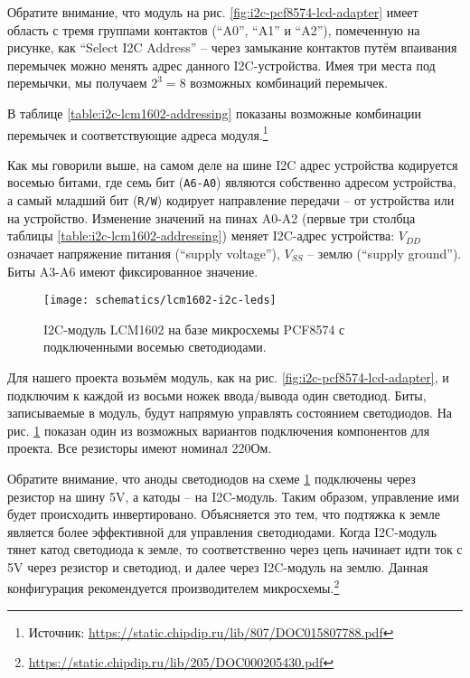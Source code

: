 \documentclass[../sparc.tex]{subfiles}
\begin{document}
Обратите внимание, что модуль на рис. \ref{fig:i2c-pcf8574-lcd-adapter} имеет
область с тремя группами контактов (``A0'', ``A1'' и ``A2''), помеченную на
рисунке, как ``Select I2C Address'' -- через замыкание контактов путём впаивания
перемычек можно менять адрес данного I2C-устройства.  Имея три места под
перемычки, мы получаем $2^3 = 8$ возможных комбинаций перемычек.


В таблице \ref{table:i2c-lcm1602-addressing} показаны возможные комбинации
перемычек и соответствующие адреса модуля.\footnote{Источник:
\url{https://static.chipdip.ru/lib/807/DOC015807788.pdf}}

Как мы говорили выше, на самом деле на шине I2C адрес устройства кодируется
восемью битами, где семь бит (\texttt{A6-A0}) являются собственно адресом
устройства, а самый младший бит (\texttt{R/W}) кодирует направление передачи --
от устройства или на устройство.  Изменение значений на пинах A0-A2 (первые три
столбца таблицы \ref{table:i2c-lcm1602-addressing}) меняет I2C-адрес устройства:
$V_{DD}$ означает напряжение питания (``supply voltage''), $V_{SS}$ -- землю
(``supply ground'').  Биты A3-A6 имеют фиксированное значение.

\begin{figure}[H]
  \centering
  \texttt{[image: schematics/lcm1602-i2c-leds]}
  \caption{I2C-модуль LCM1602 на базе микросхемы PCF8574 с подключенными восемью
    светодиодами.}
  \label{fig:lcm1602-i2c-leds}
\end{figure}

Для нашего проекта возьмём модуль, как на рис.
\ref{fig:i2c-pcf8574-lcd-adapter}, и подключим к каждой из восьми ножек
ввода/вывода один светодиод.  Биты, записываемые в модуль, будут напрямую
управлять состоянием светодиодов.  На рис. \ref{fig:lcm1602-i2c-leds} показан
один из возможных вариантов подключения компонентов для проекта.  Все резисторы
имеют номинал 220Ом.

Обратите внимание, что аноды светодиодов на схеме \ref{fig:lcm1602-i2c-leds}
подключены через резистор на шину 5V, а катоды -- на I2C-модуль.  Таким образом,
управление ими будет происходить инвертировано.  Объясняется это тем, что
подтяжка к земле является более эффективной для управления светодиодами.  Когда
I2C-модуль тянет катод светодиода к земле, то соответственно через цепь начинает
идти ток с 5V через резистор и светодиод, и далее через I2C-модуль на землю.
Данная конфигурация рекомендуется производителем
микросхемы.\footnote{\url{https://static.chipdip.ru/lib/205/DOC000205430.pdf}}
\end{document}
